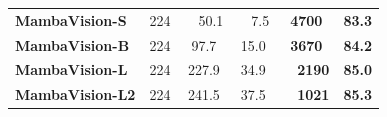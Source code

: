 \documentclass[10pt,twocolumn,letterpaper]{article}
\begin{document}
\begin{table}[t]
{{\begin{tabular}[t]{lccccc}
\rowcolor{Gray} 
\textbf{MambaVision-S} &  224 &\ \  50.1 &\ \  7.5 & \textbf{4700} &  \textbf{83.3} \\
\rowcolor{Gray}
\textbf{MambaVision-B} &  224 & 97.7 & 15.0 & \textbf{3670} &  \textbf{84.2} \\
\rowcolor{Gray}
\textbf{MambaVision-L} &  224 & 227.9 & 34.9 &\ \  \textbf{2190} &  \textbf{85.0} \\
\rowcolor{Gray}
\textbf{MambaVision-L2} &  224 & 241.5 & 37.5 &\ \  \textbf{1021} &  \textbf{85.3} \\

\bottomrule
\end{tabular}}
}
\label{tab:imgnet}
\end{table}
\end{document}

